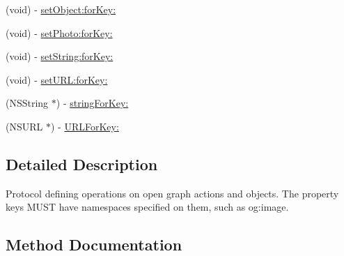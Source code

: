 \begin{DoxyCompactItemize}
\item 
(void) -\/ \hyperlink{protocol_f_b_s_d_k_share_open_graph_value_containing-p_ae39e1fd18cb249dbb5f52a1e02dbff46}{set\+Object\+:for\+Key\+:}
\item 
(void) -\/ \hyperlink{protocol_f_b_s_d_k_share_open_graph_value_containing-p_afed78fe30a2e21d2fe642f736ec5f716}{set\+Photo\+:for\+Key\+:}
\item 
(void) -\/ \hyperlink{protocol_f_b_s_d_k_share_open_graph_value_containing-p_a3086cc4cb361c847da35893101cf3f89}{set\+String\+:for\+Key\+:}
\item 
(void) -\/ \hyperlink{protocol_f_b_s_d_k_share_open_graph_value_containing-p_ad986927ecf2fd3786b1e7732cc5c76a5}{set\+U\+R\+L\+:for\+Key\+:}
\item 
(N\+S\+String $\ast$) -\/ \hyperlink{protocol_f_b_s_d_k_share_open_graph_value_containing-p_a11906a21c6657a4c7028b324918c3e81}{string\+For\+Key\+:}
\item 
(N\+S\+U\+R\+L $\ast$) -\/ \hyperlink{protocol_f_b_s_d_k_share_open_graph_value_containing-p_a21f89dae3641363d84d29100739c044c}{U\+R\+L\+For\+Key\+:}
\end{DoxyCompactItemize}


\subsection{Detailed Description}
Protocol defining operations on open graph actions and objects.  The property keys M\+U\+S\+T have namespaces specified on them, such as {\ttfamily og\+:image}. 

\subsection{Method Documentation}
\hypertarget{protocol_f_b_s_d_k_share_open_graph_value_containing-p_a296592db96a532877e7a5cce0252bbc6}{}
